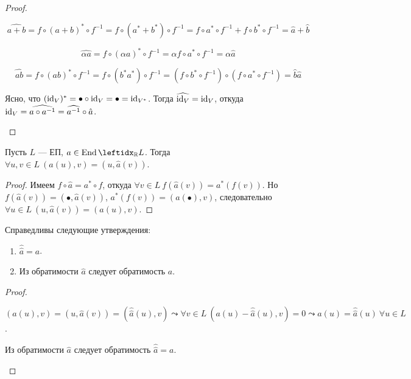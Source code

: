 \begin{proof}
    \begin{proofpart}
        $$\widehat{a + b} = f \circ (a + b)^* \circ f^{-1} = f \circ (a^* + b^*) \circ f^{-1} = f \circ a^* \circ f^{-1} + f \circ b^* \circ f^{-1} = \hat{a} + \hat{b}$$
    \end{proofpart}

    \begin{proofpart}
        $$\widehat{\alpha a} = f \circ (\alpha a)^* \circ f^{-1} = \alpha f \circ a^* \circ f^{-1} = \alpha \hat{a}$$
    \end{proofpart}

    \begin{proofpart}
        $$\widehat{ab} = f \circ (ab)^* \circ f^{-1} = f \circ (b^* a^*) \circ f^{-1} = (f \circ b^* \circ f^{-1}) \circ (f \circ a^* \circ f^{-1}) = \hat{b} \hat{a}$$
    \end{proofpart}

    \begin{proofpart}
        Ясно, что $(\operatorname{id}_V)^* = \bullet \circ \operatorname{id}_V = \bullet = \operatorname{id}_{V^*}$. Тогда $\widehat{\operatorname{id}_V} = \operatorname{id}_V$, откуда $\operatorname{id}_V = \widehat{a \circ a^{-1}} = \widehat{a^{-1}} \circ \hat{a}$.
    \end{proofpart}
\end{proof}

\begin{thm}
    Пусть $L$ --- ЕП, $a \in \End \lsub{\mathbb{R}}{L}$. Тогда $\forall u, v \in L\ (a(u), v) = (u, \hat{a}(v))$.
\end{thm}

\begin{proof}
    Имеем $f \circ \hat{a} = a^* \circ f$, откуда $\forall v \in L\ f(\hat{a}(v)) = a^*(f(v))$. Но $f(\hat{a}(v)) = (\bullet, \hat{a}(v))$, $a^*(f(v)) = (a(\bullet), v)$, следовательно $\forall u \in L\ (u, \hat{a}(v)) = (a(u), v)$.
\end{proof}

\begin{cor}
    Справедливы следующие утверждения:
    \begin{enumerate}
        \item $\hat{\hat{a}} = a$.
        \item Из обратимости $\hat{a}$ следует обратимость $a$.
    \end{enumerate}
\end{cor}

\begin{proof}
    \begin{proofpart}
        $(a(u), v) = (u, \hat{a}(v)) = (\hat{\hat{a}}(u), v) \leadsto \forall v \in L\ (a(u) - \hat{\hat{a}}(u), v) = 0 \leadsto a(u) = \hat{\hat{a}}(u)\ \forall u \in L$.
    \end{proofpart}

    \begin{proofpart}
        Из обратимости $\hat{a}$ следует обратимость $\hat{\hat{a}} = a$.
    \end{proofpart}
\end{proof}

